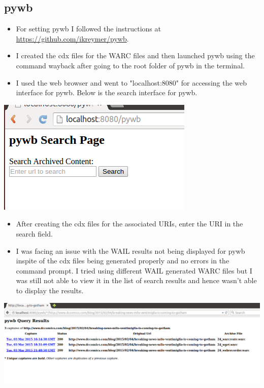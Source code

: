 \subsection{pywb}
\begin{itemize}
\item For setting pywb I followed the instructions at \hyperref[savePage]{https://github.com/ikreymer/pywb}.
\item I created the cdx files for the WARC files and then launched pywb using the command wayback after going to the root folder of pywb in the terminal.
\item I used the web browser and went to "localhost:8080" for accessing the web interface for pywb. Below is the search interface for pywb. 
\end{itemize}
\begin{minipage}{\linewidth}
	\includegraphics[scale=0.55]{figures/playback/search.PNG}
	\centering
	\label{search}
\end{minipage}
\begin{itemize}
\item After creating the cdx files for the associated URIs, enter the URI in the search field.
\item I was facing an issue with the WAIL results not being displayed for pywb inspite of the cdx files being generated properly and no errors in the command prompt. I tried using different WAIL generated WARC files but I was still not able to view it in the list of search results and hence wasn't able to display the results.
\end{itemize}
\begin{minipage}{\linewidth}
	\includegraphics[scale=0.55]{figures/playback/pywb_search_page.PNG}
	\centering	
	\label{pywb_search_page}
\end{minipage}
